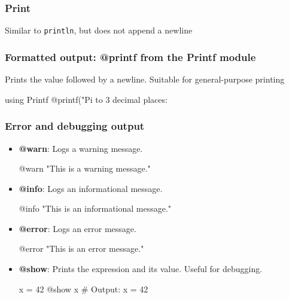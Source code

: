 \documentclass{report}
\begin{document}
    \subsubsection{Print}
    \bigbreak \noindent 
    Similar to \texttt{println}, but does not append a newline

    \bigbreak \noindent 
    \subsubsection{Formatted output: @printf from the Printf module}
    \bigbreak \noindent 
    Prints the value followed by a newline. Suitable for general-purpose printing
    \bigbreak \noindent 
    \begin{jlcode}
    using Printf
    @printf("Pi to 3 decimal places: %
    \end{jlcode}
    \bigbreak \noindent 
    \subsubsection{Error and debugging output}
    \bigbreak \noindent 
    \begin{itemize}
        \item \textbf{@warn}: Logs a warning message.
            \bigbreak \noindent 
            \begin{jlcode}
                @warn "This is a warning message."
            \end{jlcode}
        \item \textbf{@info}: Logs an informational message.
            \bigbreak \noindent 
            \begin{jlcode}
            @info "This is an informational message."
            \end{jlcode}
        \item \textbf{@error}: Logs an error message.
            \bigbreak \noindent 
            \begin{jlcode}
            @error "This is an error message."
            \end{jlcode}
        \item \textbf{@show}: Prints the expression and its value. Useful for debugging.
            \bigbreak \noindent 
            \begin{jlcode}
                x = 42
                @show x  # Output: x = 42
            \end{jlcode}
    \end{itemize}
    \bigbreak \noindent 
\end{document}
